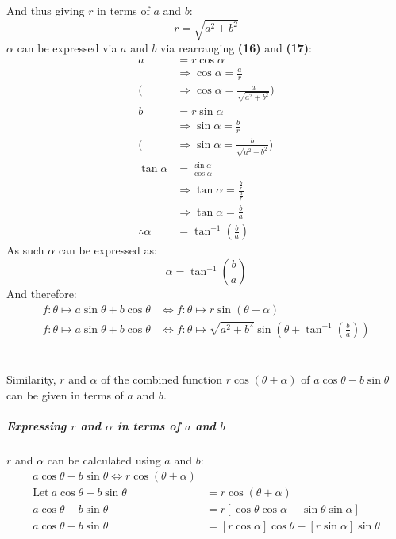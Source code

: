 \documentclass{article}
\begin{document}
        And thus giving $r$ in terms of $a$ and $b$:
        \begin{equation}
            r = \sqrt{a^2 + b^2}
        \end{equation}
        $\alpha$ can be expressed via $a$ and $b$ via rearranging \textbf{(16)} and \textbf{(17)}:
        \begin{align*}
            a &= r\cos\alpha \\
            &\Rightarrow \cos\alpha = \frac{a}{r} \\
            (&\Rightarrow \cos\alpha = \frac{a}{\sqrt{a^2 + b^2}}) \\
            b &= r\sin\alpha \\
            &\Rightarrow \sin\alpha = \frac{b}{r} \\
            (&\Rightarrow \sin\alpha = \frac{b}{\sqrt{a^2 + b^2}}) \\
            \tan\alpha &= \frac{\sin\alpha}{\cos\alpha} \\
            &\Rightarrow \tan\alpha = \frac{\frac{b}{r}}{\frac{a}{r}} \\
            &\Rightarrow \tan\alpha = \frac{b}{a} \\
            \therefore \alpha &= \tan^{-1}{\left( \frac{b}{a}\right) }
        \end{align*}
        As such $\alpha$ can be expressed as:
        \begin{equation}
            \alpha = \tan^{-1}{\left( \frac{b}{a}\right) }
        \end{equation}
        And therefore:
        \begin{align*}
            f:\theta \mapsto a\sin\theta + b\cos\theta &\Leftrightarrow f:\theta \mapsto r\sin{\left( \theta + \alpha \right) } \\
            f:\theta \mapsto a\sin\theta + b\cos\theta &\Leftrightarrow f:\theta \mapsto \sqrt{a^2 + b^2}\sin{\left( \theta + \tan^{-1}{\left( \frac{b}{a}\right) }\right) }
        \end{align*}
        \\\\
        Similarity, $r$ and $\alpha$ of the combined function $r\cos{(\theta + \alpha)}$ of $a\cos{\theta} - b\sin{\theta}$ can be given in terms of $a$ and $b$.
        \subparagraph{Expressing $r$ and $\alpha$ in terms of $a$ and $b$} $r$ and $\alpha$ can be calculated using $a$ and $b$:
        \begin{align*}
        a\cos{\theta} - b\sin{\theta} \Leftrightarrow r\cos{(\theta + \alpha)} \\
        \mathrm{Let \ } a\cos{\theta} - b\sin{\theta} &= r\cos{(\theta + \alpha)} \\
        a\cos{\theta} - b\sin{\theta} &= r[\cos\theta\cos\alpha - \sin\theta\sin\alpha] \\
        a\cos{\theta} - b\sin{\theta} &= [r\cos\alpha]\cos{\theta} - [r\sin\alpha]\sin{\theta}
        \end{align*}
\end{document}
